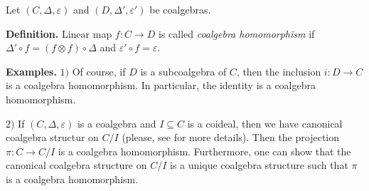 \documentclass[12pt]{article}
\begin{document}
Let $(C,\Delta,\varepsilon)$ and $(D,\Delta',\varepsilon')$ be coalgebras.

\textbf{Definition.} Linear map $f:C\to D$ is called \textit{coalgebra homomorphism} if $\Delta'\circ f=(f\otimes f)\circ\Delta$ and $\varepsilon'\circ f=\varepsilon$.

\textbf{Examples.}
$1)$ Of course, if $D$ is a subcoalgebra of $C$, then the inclusion $i:D\to C$ is a coalgebra homomorphism. In particular, the identity is a coalgebra homomorphism.

$2)$ If $(C,\Delta,\varepsilon)$ is a coalgebra and $I\subseteq C$ is a coideal, then we have canonical coalgebra structur on $C/I$ (please, see  for more details). Then the projection $\pi:C\to C/I$ is a coalgebra homomorphism. Furthermore, one can show that the canonical coalgebra structure on $C/I$ is a unique coalgebra structure such that $\pi$ is a coalgebra homomorphism.
\end{document}
